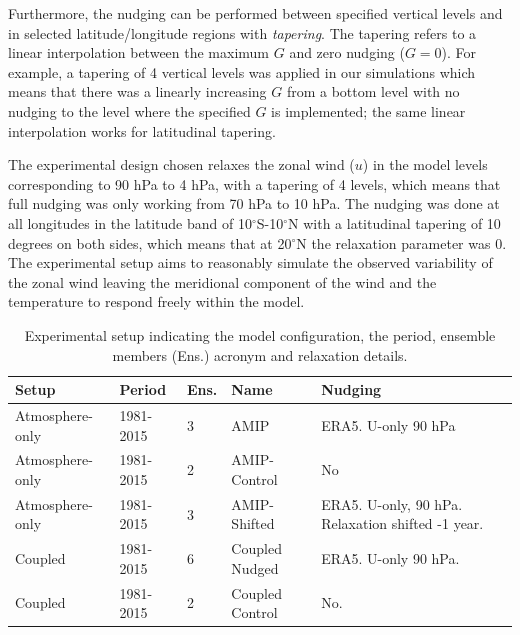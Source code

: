 Furthermore, the nudging can be performed between specified vertical levels and in selected latitude/longitude regions with \textit{tapering}. The tapering refers to a linear interpolation between the maximum $G$ and zero nudging ($G=0$). 
For example, a tapering of 4 vertical levels was applied in our simulations which means that there was a linearly increasing $G$ from a bottom level with no nudging to the level where the specified $G$ is  implemented; the same linear interpolation works for latitudinal tapering.

The experimental design chosen relaxes the zonal wind ($u$) in the model levels corresponding to 90 hPa to 4 hPa, with a tapering of 4 levels, which means that full nudging was only working from 70 hPa to 10 hPa. The nudging was done at all longitudes in the latitude band of 10$^\circ$S-10$^\circ$N with a latitudinal tapering of 10 degrees on both sides, which means that at 20$^\circ$N the relaxation parameter was 0.
The experimental setup aims to reasonably simulate the observed variability of the zonal wind leaving the meridional component of the wind and the temperature to respond freely within the model. 

\begin{table}[t!]
\caption{Experimental setup indicating the model configuration, the period, ensemble members (Ens.) acronym and relaxation details.}
\begin{tabular}{p{3.2cm}|p{}|p{1.35cm}|p{3cm}|p{4.85cm}} \label{tab:nudg_exps}
Setup           & Period    & Ens.& Name            & Nudging                                          \\ \hline \hline
Atmosphere-only & 1981-2015 & 3                & AMIP            & ERA5. U-only 90 hPa                              \\
Atmosphere-only & 1981-2015 & 2                & AMIP-Control    & No                                               \\
Atmosphere-only & 1981-2015 & 3                & AMIP-Shifted    & ERA5. U-only, 90 hPa. Relaxation shifted -1 year. \\
Coupled         & 1981-2015 & 6                & Coupled Nudged     & ERA5. U-only 90 hPa.                             \\
Coupled         & 1981-2015 & 2                & Coupled Control & No.                                             
\end{tabular}
\end{table}


